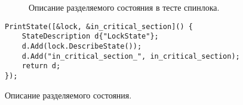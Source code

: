 \begin{figure}
	\bigskip
	\caption{Описание разделяемого состояния в тесте спинлока.}\label{fig:descr}
\end{figure}

\else

\begin{listing}
	\centering
	
	\begin{verbatim}
PrintState([&lock, &in_critical_section]() {
	StateDescription d{"LockState"};
	d.Add(lock.DescribeState());
	d.Add("in_critical_section_", in_critical_section);
	return d;
});
	\end{verbatim}
	\caption{Описание разделяемого состояния.}
	
\end{listing}

\fi
